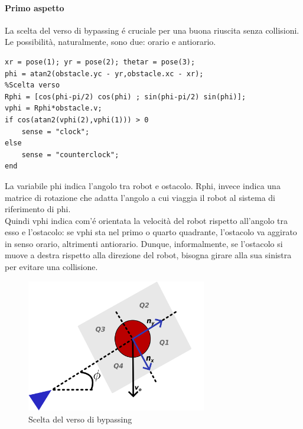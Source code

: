 \documentclass[14pt,a4paper]{extarticle}
\begin{document}
\paragraph{Primo aspetto}
La scelta del verso di bypassing é cruciale per una buona riuscita senza collisioni. Le possibilità, naturalmente, sono due: orario e antiorario.
\begin{lstlisting}[caption=Calcolo del verso di bypassing (orario o antiorario)]
xr = pose(1); yr = pose(2); thetar = pose(3); 
phi = atan2(obstacle.yc - yr,obstacle.xc - xr);
%Scelta verso
Rphi = [cos(phi-pi/2) cos(phi) ; sin(phi-pi/2) sin(phi)];
vphi = Rphi*obstacle.v;
if cos(atan2(vphi(2),vphi(1))) > 0
	sense = "clock";
else
	sense = "counterclock";
end
\end{lstlisting} 
La variabile phi indica l'angolo tra robot e ostacolo. Rphi, invece indica una matrice di rotazione che adatta l'angolo a cui viaggia il robot al sistema di riferimento di phi.\\
Quindi vphi indica com'é orientata la velocità del robot rispetto all'angolo tra esso e l'ostacolo: se vphi sta nel primo o quarto quadrante, l'ostacolo va aggirato in senso orario, altrimenti antiorario. Dunque, informalmente, se l'ostacolo si muove a destra rispetto alla direzione del robot, bisogna girare alla sua sinistra per evitare una collisione.
\begin{figure}[H]
\caption{Scelta del verso di bypassing}
\centering
\includegraphics[width=0.7\textwidth]{sceltaverso.png}
\end{figure}
\end{document}
